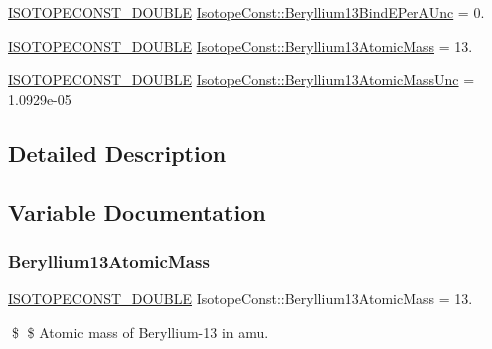 \begin{DoxyCompactItemize}
\mbox{\hyperlink{group___isotope_const-_macros_ga8f45a7272ce02c0b4c65c44636ed719a}{I\+S\+O\+T\+O\+P\+E\+C\+O\+N\+S\+T\+\_\+\+D\+O\+U\+B\+LE}} \mbox{\hyperlink{group___isotope_const-_beryllium-_be13_ga270846ee7a5be494b191233c87140dac}{Isotope\+Const\+::\+Beryllium13\+Bind\+E\+Per\+A\+Unc}} = 0.
\item 
\mbox{\hyperlink{group___isotope_const-_macros_ga8f45a7272ce02c0b4c65c44636ed719a}{I\+S\+O\+T\+O\+P\+E\+C\+O\+N\+S\+T\+\_\+\+D\+O\+U\+B\+LE}} \mbox{\hyperlink{group___isotope_const-_beryllium-_be13_ga06950328b2e3fe2f95177a7526ccd3a2}{Isotope\+Const\+::\+Beryllium13\+Atomic\+Mass}} = 13.
\item 
\mbox{\hyperlink{group___isotope_const-_macros_ga8f45a7272ce02c0b4c65c44636ed719a}{I\+S\+O\+T\+O\+P\+E\+C\+O\+N\+S\+T\+\_\+\+D\+O\+U\+B\+LE}} \mbox{\hyperlink{group___isotope_const-_beryllium-_be13_ga364c15f0bdf3547a88777b5f619615e6}{Isotope\+Const\+::\+Beryllium13\+Atomic\+Mass\+Unc}} = 1.\+0929e-\/05
\end{DoxyCompactItemize}


\subsection{Detailed Description}


\subsection{Variable Documentation}
\mbox{\label{group___isotope_const-_beryllium-_be13_ga06950328b2e3fe2f95177a7526ccd3a2}} 
\subsubsection{\texorpdfstring{Beryllium13\+Atomic\+Mass}{Beryllium13AtomicMass}}
{\footnotesize\ttfamily \mbox{\hyperlink{group___isotope_const-_macros_ga8f45a7272ce02c0b4c65c44636ed719a}{I\+S\+O\+T\+O\+P\+E\+C\+O\+N\+S\+T\+\_\+\+D\+O\+U\+B\+LE}} Isotope\+Const\+::\+Beryllium13\+Atomic\+Mass = 13.}

\$ \$ Atomic mass of Beryllium-\/13 in amu. \mbox{\label{group___isotope_const-_beryllium-_be13_ga364c15f0bdf3547a88777b5f619615e6}} 
